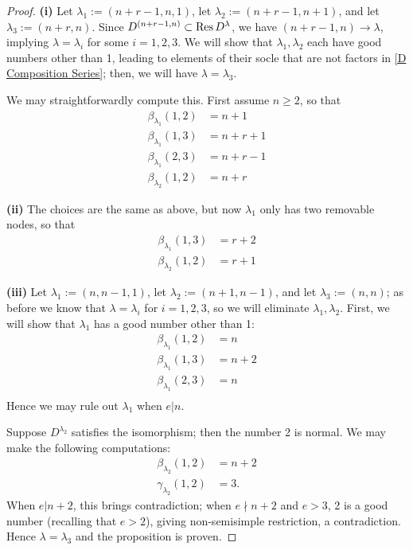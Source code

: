 \documentclass{amsart}
\begin{document}
\begin{proof}
  \textbf{(i)}
  Let $\lambda_1 := (n+r-1,n,1)$, let $\lambda_2 := (n+r-1,n+1)$, and let $\lambda_3 := (n + r,n)$.
  Since $D^{(n+r-1,n)} \subset \text{Res} \, D^\lambda$, we have $(n + r - 1,n) \longrightarrow \lambda$, implying $\lambda = \lambda_i$ for some $i = 1,2,3$.
  We will show that $\lambda_1,\lambda_2$ each have good numbers other than 1, leading to elements of their socle that are not factors in \eqref{D Composition Series};
  then, we will have $\lambda = \lambda_3$.

  We may straightforwardly compute this.
  First assume $n \geq 2$, so that
  \begin{align*}
    \beta_{\lambda_1}(1,2) &= n + 1\\
    \beta_{\lambda_1}(1,3) &= n + r + 1\\
    \beta_{\lambda_1}(2,3) &= n + r - 1\\
    \beta_{\lambda_2}(1,2) &= n + r
  \end{align*}

  \textbf{(ii)}
  The choices are the same as above, but now $\lambda_1$ only has two removable nodes, so that
  \begin{align*}
    \beta_{\lambda_1}(1,3) &= r + 2\\
    \beta_{\lambda_2}(1,2) &= r + 1
  \end{align*}

  \textbf{(iii)}
  Let $\lambda_1 := (n,n-1,1)$, let $\lambda_2 := (n+1,n-1)$, and let $\lambda_3 := (n,n)$;
  as before we know that $\lambda = \lambda_i$ for $i = 1,2,3$, so we will eliminate $\lambda_1,\lambda_2$.
  First, we will show that $\lambda_1$ has a good number other than 1:
  \begin{align*}
    \beta_{\lambda_1}(1,2) &= n\\
    \beta_{\lambda_1}(1,3) &= n + 2\\
    \beta_{\lambda_1}(2,3) &= n\\
  \end{align*}
  Hence we may rule out $\lambda_1$ when $e | n$.


  Suppose $D^{\lambda_2}$ satisfies the isomorphism;
  then the number 2 is normal.
  We may make the following computations:
   \begin{align*}
    \beta_{\lambda_2}(1,2) &= n + 2\\
    \gamma_{\lambda_2}(1,2) &= 3.
  \end{align*}
  When $e | n + 2$, this brings contradiction;
  when $e \nmid n + 2$ and $e > 3$, 2 is a good number (recalling that $e > 2$), giving non-semisimple restriction, a contradiction.
  Hence $\lambda = \lambda_3$ and the proposition is proven.
\end{proof}
\fi
\end{document}
